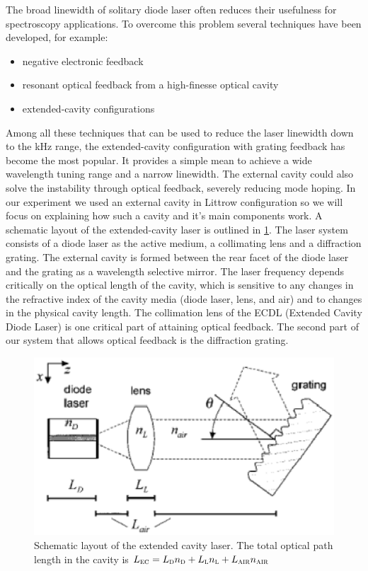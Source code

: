 The broad linewidth of solitary diode laser often reduces their usefulness for spectroscopy applications. To overcome this problem several techniques have been developed, for example:
\begin{itemize}
\item negative electronic feedback
\item resonant optical feedback from a high-finesse optical cavity
\item extended-cavity configurations
\end{itemize}
Among all these techniques that can be used to reduce the laser linewidth down to the kHz range, the extended-cavity configuration with grating feedback has become the most popular. It provides a simple mean to achieve a wide wavelength tuning range and a narrow linewidth.
The external cavity could also solve the instability through optical feedback, severely reducing mode hoping.
In our experiment we used an external cavity in Littrow configuration so we will focus on explaining how such a cavity and it's main components work.
A schematic layout of the extended-cavity laser is outlined in \cref{grating}. The laser system consists of a diode laser as the active medium, a collimating lens and a diffraction grating. The external cavity is formed between the rear facet of the diode laser and the grating as a wavelength selective mirror. The laser frequency depends critically on the optical length of the cavity, which is sensitive to any changes in the refractive index of the cavity media (diode laser, lens, and air) and to changes in the physical cavity length.
The collimation lens of the ECDL (Extended Cavity Diode Laser) is one critical part of attaining optical feedback. The second part of our system that allows optical feedback is the diffraction  grating. 

\begin{figure}[!hbt]\centering
\includegraphics[width=\linewidth, draft=\foto]{eps/littrow1.eps}
\caption{Schematic layout of the extended cavity laser. The total optical path length in the cavity is $L_{\mbox{\footnotesize{\scshape{ec}}}}=L_{\mbox{\footnotesize{\scshape{d}}}}n_{\mbox{\footnotesize{\scshape{d}}}}+L_{\mbox{\footnotesize{\scshape{l}}}}n_{\mbox{\footnotesize{\scshape{l}}}}+L_{\mbox{\footnotesize{\scshape{air}}}}n_{\mbox{\footnotesize{\scshape{air}}}}$}
\label{grating}
\end{figure}

